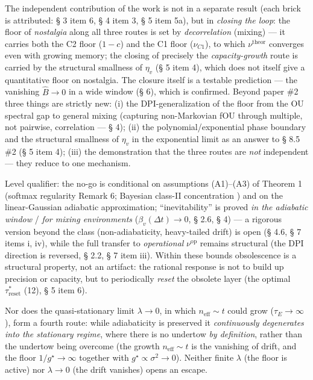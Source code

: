 \documentclass[12pt]{iopart}
\begin{document}
The independent contribution of the work is not in a separate result (each brick is attributed: § 3 item 6, § 4 item 3, § 5 item 5a), but in \emph{closing the loop}: the floor of \emph{nostalgia} along all three routes is set by \emph{decorrelation} (mixing) --- it carries both the C2 floor (\(1-c\)) and the C1 floor (\(\nu_{C1}\)), to which \(\nu^{\text{theor}}\) converges even with growing memory; the closing of precisely the \emph{capacity-growth} route is carried by the structural smallness of \(\eta_v\) (§ 5 item 4), which does not itself give a quantitative floor on nostalgia. The closure itself is a testable prediction --- the vanishing \(\hat B \to 0\) in a wide window (§ 6), which is confirmed. Beyond paper \#2 three things are strictly new: (i) the DPI-generalization of the floor from the OU spectral gap to general mixing (capturing non-Markovian fOU through multiple, not pairwise, correlation --- § 4); (ii) the polynomial/exponential phase boundary and the structural smallness of \(\eta_v\) in the exponential limit as an answer to § 8.5 \#2 \cite{Andriishin2026b} (§ 5 item 4); (iii) the demonstration that the three routes are \emph{not} independent --- they reduce to one mechanism.



Level qualifier: the no-go is conditional on assumptions (A1)--(A3) of Theorem 1 (softmax regularity \cite{Andriishin2026b} Remark 6; Bayesian class-II concentration \cite{BialekNemenmanTishby2001}) and on the linear-Gaussian adiabatic approximation; ``inevitability'' is proved \emph{in the adiabatic window} / \emph{for mixing environments} (\(\beta_v(\Delta t)\to0\), § 2.6, § 4) --- a rigorous version beyond the class (non-adiabaticity, heavy-tailed drift) is open (§ 4.6, § 7 items i, iv), while the full transfer to \emph{operational} \(\nu^{\text{op}}\) remains structural (the DPI direction is reversed, § 2.2, § 7 item iii). Within these bounds obsolescence is a structural property, not an artifact: the rational response is not to build up precision or capacity, but to periodically \emph{reset} the obsolete layer (the optimal \(\tau_{\text{reset}}^*\) \cite{Andriishin2026b} (12), § 5 item 6).



Nor does the quasi-stationary limit \(\lambda \to 0\), in which \(n_{\text{eff}} \sim t\) could grow (\(\tau_E \to \infty\)), form a fourth route: while adiabaticity is preserved it \emph{continuously degenerates into the stationary regime}, where there is no undertow \emph{by definition}, rather than the undertow being overcome (the growth \(n_{\text{eff}} \sim t\) is the vanishing of drift, and the floor \(1/g^\star \to \infty\) together with \(g^\star \propto \sigma^2 \to 0\)). Neither finite \(\lambda\) (the floor is active) nor \(\lambda \to 0\) (the drift vanishes) opens an escape.
\end{document}
